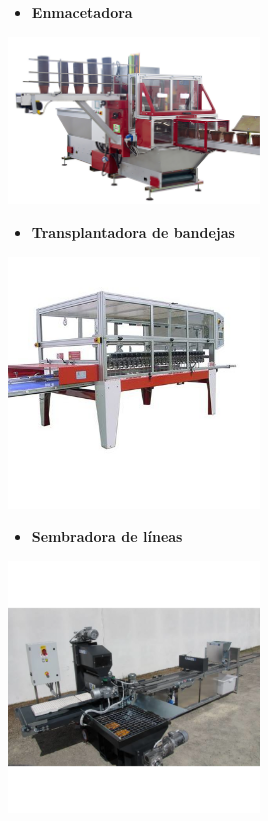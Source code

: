 \documentclass[a4paper,12pt,oneside]{article}
\begin{document}
\begin{itemize}
\item \textbf{Enmacetadora}
\end{itemize}
\begin{center}
\includegraphics[width=0.5\textwidth]{./img_uf1596/enmacetadora.jpg}
\end{center}
\begin{itemize}
\item \textbf{Transplantadora de bandejas}
\end{itemize}
\begin{center}
\includegraphics[width=0.5\textwidth]{./img_uf1596/transplantadora_bandejas.jpg}
\end{center}
\begin{itemize}
\item \textbf{Sembradora de líneas}
\end{itemize}
\begin{center}
\includegraphics[width=0.5\textwidth]{./img_uf1596/sembradora_bandejas.png}
\end{center}
\end{document}
